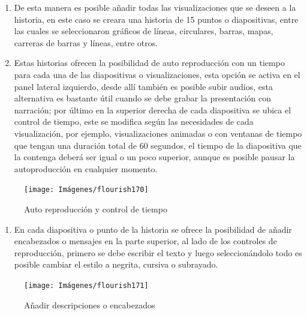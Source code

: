 \documentclass[
]{book}
\providecommand{\tightlist}{%
  \setlength{\itemsep}{0pt}\setlength{\parskip}{0pt}}
\begin{document}
\begin{enumerate}
\def\labelenumi{\arabic{enumi}.}
\setcounter{enumi}{4}
\item
  De esta manera es posible añadir todas las visualizaciones que se deseen a la historia, en este caso se creara una historia de 15 puntos o diapositivas, entre las cuales se seleccionaron gráficos de líneas, circulares, barras, mapas, carreras de barras y líneas, entre otros.
\item
  Estas historias ofrecen la posibilidad de auto reproducción con un tiempo para cada una de las diapositivas o visualizaciones, esta opción se activa en el panel lateral izquierdo, desde allí también es posible subir audios, esta alternativa es bastante útil cuando se debe grabar la presentación con narración; por último en la superior derecha de cada diapositiva se ubica el control de tiempo, este se modifica según las necesidades de cada visualización, por ejemplo, visualizaciones animadas o con ventanas de tiempo que tengan una duración total de 60 segundos, el tiempo de la diapositiva que la contenga deberá ser igual o un poco superior, aunque es posible pausar la autoproducción en cualquier momento.
\end{enumerate}

\begin{figure}

{\centering \texttt{[image: Imágenes/flourish170]} 

}

\caption{Auto reproducción y control de tiempo}\label{fig:paso6historiaflourish-fig}
\end{figure}

\begin{enumerate}
\def\labelenumi{\arabic{enumi}.}
\setcounter{enumi}{6}
\tightlist
\item
  En cada diapositiva o punto de la historia se ofrece la posibilidad de añadir encabezados o mensajes en la parte superior, al lado de los controles de reproducción, primero se debe escribir el texto y luego seleccionándolo todo es posible cambiar el estilo a negrita, cursiva o subrayado.
\end{enumerate}

\begin{figure}

{\centering \texttt{[image: Imágenes/flourish171]} 

}

\caption{Añadir descripciones o encabezados}\label{fig:paso7historiaflourish-fig}
\end{figure}
\end{document}
